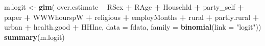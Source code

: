 \documentclass[]{article}
\newenvironment{Shaded}{\begin{snugshade}}{\end{snugshade}}
\newcommand{\DataTypeTok}[1]{\textcolor[rgb]{0.13,0.29,0.53}{#1}}
\newcommand{\KeywordTok}[1]{\textcolor[rgb]{0.13,0.29,0.53}{\textbf{#1}}}
\newcommand{\NormalTok}[1]{#1}
\newcommand{\OperatorTok}[1]{\textcolor[rgb]{0.81,0.36,0.00}{\textbf{#1}}}
\newcommand{\StringTok}[1]{\textcolor[rgb]{0.31,0.60,0.02}{#1}}
\begin{document}
\begin{Shaded}
\begin{Highlighting}[]
\NormalTok{m.logit <-}\StringTok{ }\KeywordTok{glm}\NormalTok{( over.estimate }\OperatorTok{~}\StringTok{ }\NormalTok{RSex }\OperatorTok{+}\StringTok{ }\NormalTok{RAge }\OperatorTok{+}\StringTok{ }\NormalTok{Househld }\OperatorTok{+}\StringTok{ }\NormalTok{party_self }\OperatorTok{+}\StringTok{ }\NormalTok{paper }\OperatorTok{+}\StringTok{ }\NormalTok{WWWhourspW }\OperatorTok{+}\StringTok{  }
\StringTok{                  }\NormalTok{religious }\OperatorTok{+}\StringTok{  }\NormalTok{employMonths }\OperatorTok{+}\StringTok{ }\NormalTok{rural }\OperatorTok{+}\StringTok{ }\NormalTok{partly.rural }\OperatorTok{+}\StringTok{ }\NormalTok{urban }\OperatorTok{+}\StringTok{ }\NormalTok{health.good }\OperatorTok{+}\StringTok{ }
\StringTok{                  }\NormalTok{HHInc, }\DataTypeTok{data =}\NormalTok{ fdata, }\DataTypeTok{family =} \KeywordTok{binomial}\NormalTok{(}\DataTypeTok{link =} \StringTok{"logit"}\NormalTok{))}
\KeywordTok{summary}\NormalTok{(m.logit)}
\end{Highlighting}
\end{Shaded}
\end{document}
